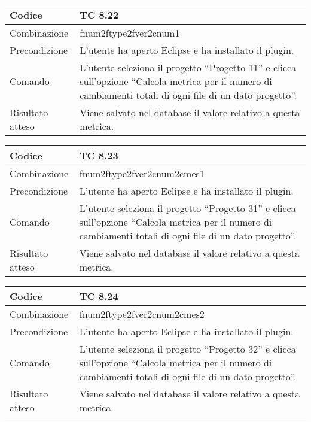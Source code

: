 \begin{table}[ht]
\begin{tabular}{|p{3cm}|p{9cm}|}
\hline
\cellcolor{lightgray}Codice				& TC 8.22								\\
\hline
\cellcolor{lightgray}Combinazione		& fnum2ftype2fver2cnum1									\\
\hline
\cellcolor{lightgray}Precondizione		& L'utente ha aperto Eclipse e ha installato il plugin.		\\
\hline
\cellcolor{lightgray}Comando			& L'utente seleziona il progetto ``Progetto 11''  e clicca sull'opzione ``Calcola metrica per il numero di cambiamenti totali di ogni file di un dato progetto''.	\\
\hline
\cellcolor{lightgray}Risultato atteso	& Viene salvato nel database il valore relativo a questa metrica.\\
\hline
\end{tabular}
\end{table}

\begin{table}[ht]
\begin{tabular}{|p{3cm}|p{9cm}|}
\hline
\cellcolor{lightgray}Codice				& TC 8.23								\\
\hline
\cellcolor{lightgray}Combinazione		& fnum2ftype2fver2cnum2cmes1									\\
\hline
\cellcolor{lightgray}Precondizione		& L'utente ha aperto Eclipse e ha installato il plugin.		\\
\hline
\cellcolor{lightgray}Comando			& L'utente seleziona il progetto ``Progetto 31''  e clicca sull'opzione ``Calcola metrica per il numero di cambiamenti totali di ogni file di un dato progetto''.	\\
\hline
\cellcolor{lightgray}Risultato atteso	& Viene salvato nel database il valore relativo a questa metrica.\\
\hline
\end{tabular}
\end{table}

\begin{table}[ht]
\begin{tabular}{|p{3cm}|p{9cm}|}
\hline
\cellcolor{lightgray}Codice				& TC 8.24								\\
\hline
\cellcolor{lightgray}Combinazione		& fnum2ftype2fver2cnum2cmes2									\\
\hline
\cellcolor{lightgray}Precondizione		& L'utente ha aperto Eclipse e ha installato il plugin.		\\
\hline
\cellcolor{lightgray}Comando			& L'utente seleziona il progetto ``Progetto 32''  e clicca sull'opzione ``Calcola metrica per il numero di cambiamenti totali di ogni file di un dato progetto''.	\\
\hline
\cellcolor{lightgray}Risultato atteso	& Viene salvato nel database il valore relativo a questa metrica.\\
\hline
\end{tabular}
\end{table}

